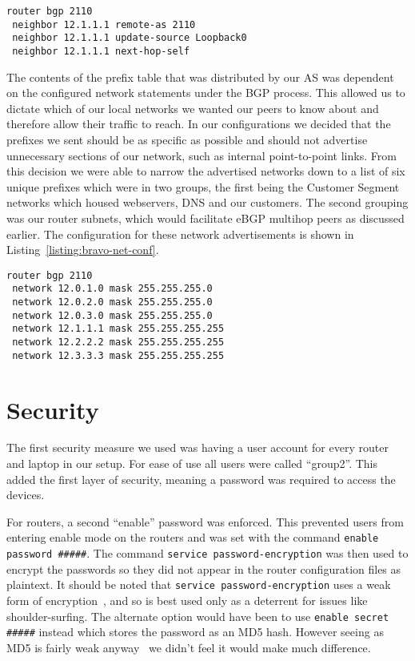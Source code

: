 \begin{lstlisting}[caption={Bravo-Alpha iBGP Configuration}, label={listing:bravo-ibgp-conf}]
router bgp 2110
 neighbor 12.1.1.1 remote-as 2110
 neighbor 12.1.1.1 update-source Loopback0
 neighbor 12.1.1.1 next-hop-self
\end{lstlisting}

The contents of the prefix table that was distributed by our AS was dependent
on the configured network statements under the BGP process. This allowed us to
dictate which of our local networks we wanted our peers to know about and
therefore allow their traffic to reach. In our configurations we decided that
the prefixes we sent should be as specific as possible and should not advertise
unnecessary sections of our network, such as internal point-to-point links.
From this decision we were able to narrow the advertised networks down to a
list of six unique prefixes which were in two groups, the first being the
Customer Segment networks which housed webservers, DNS and our customers. The
second grouping was our router subnets, which would facilitate eBGP multihop
peers as discussed earlier. The configuration for these network advertisements
is shown in Listing~\ref{listing:bravo-net-conf}.

\begin{lstlisting}[caption={Bravo BGP Network Configuration}, label={listing:bravo-net-conf}]
router bgp 2110
 network 12.0.1.0 mask 255.255.255.0
 network 12.0.2.0 mask 255.255.255.0
 network 12.0.3.0 mask 255.255.255.0
 network 12.1.1.1 mask 255.255.255.255
 network 12.2.2.2 mask 255.255.255.255
 network 12.3.3.3 mask 255.255.255.255
\end{lstlisting}

\section{Security}
The first security measure we used was having a user account for every router
and laptop in our setup. For ease of use all users were called ``group2''. This
added the first layer of security, meaning a password was required to access
the devices.

For routers, a second ``enable'' password was enforced. This prevented users
from entering enable mode on the routers and was set with the command
\texttt{enable password \#\#\#\#\#}. The command
\texttt{service~password-encryption} was then used to encrypt the passwords so
they did not appear in the router configuration files as plaintext. It should
be noted that
\texttt{service password-encryption} uses a weak form of
encryption~\cite{ciscocracker}, and so is best used only as a deterrent for
issues like shoulder-surfing. The alternate option would have been to use
\texttt{enable secret \#\#\#\#\#} instead which stores the password as an MD5
hash. However seeing as MD5 is fairly weak anyway~\cite{md5} we didn't feel it
would make much difference.

